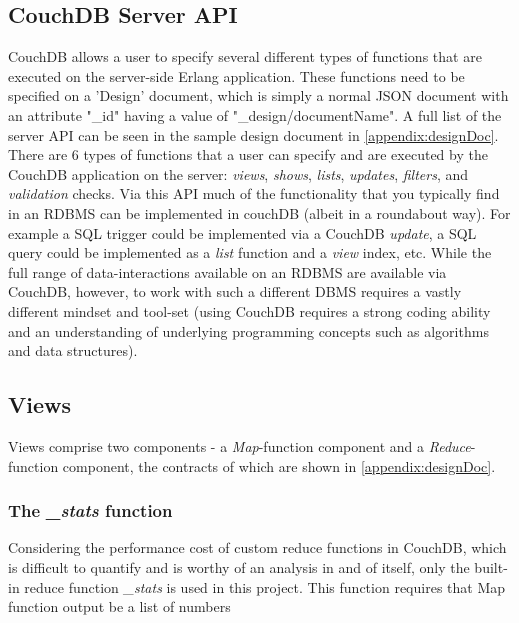 \subsection{CouchDB Server API}
CouchDB allows a user to specify several different types of functions that are executed on the server-side Erlang application. These functions need to be specified on a 'Design' document, which is simply a normal JSON document with an attribute "\_id" having a value of "\_design/documentName". A full list of the server API can be seen in the sample design document in \ref{appendix:designDoc}. There are 6 types of functions that a user can specify and are executed by the CouchDB application on the server: \textit{views}, \textit{shows}, \textit{lists}, \textit{updates}, \textit{filters}, and \textit{validation} checks. Via this API much of the functionality that you typically find in an RDBMS can be implemented in couchDB (albeit in a roundabout way). For example a SQL trigger could be implemented via a CouchDB \textit{update}, a SQL query could be implemented as a \textit{list} function and a \textit{view} index, etc. While the full range of data-interactions available on an RDBMS are available via CouchDB, however, to work with such a different DBMS requires a vastly different mindset and tool-set (using CouchDB requires a strong coding ability and an understanding of underlying programming concepts such as algorithms and data structures).

\subsection{Views}
Views comprise two components - a \textit{Map}-function component and a \textit{Reduce}-function component, the contracts of which are shown in \ref{appendix:designDoc}.

\subsubsection*{The \textit{\_stats} function}
Considering the performance cost of custom reduce functions in CouchDB, which is difficult to quantify and is worthy of an analysis in and of itself, only the built-in reduce function \textit{\_stats} is used in this project. This function requires that Map function output be a list of numbers

